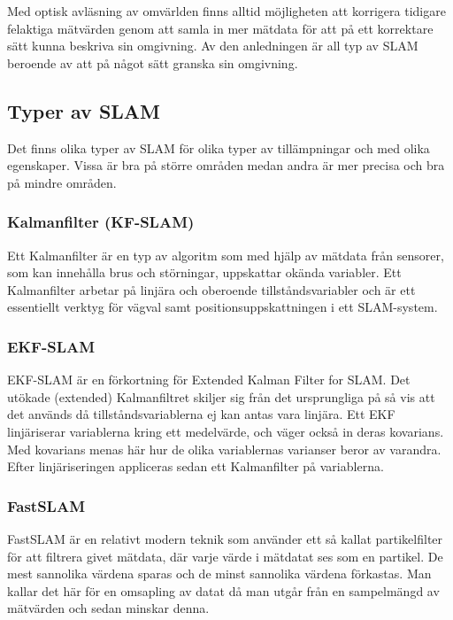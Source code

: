 \documentclass[a4paper,12pt,fleqn]{article}
\begin{document}
Med optisk avläsning av omvärlden finns alltid möjligheten att korrigera tidigare felaktiga mätvärden genom att samla in mer mätdata för att på ett korrektare sätt kunna beskriva sin omgivning. Av den anledningen är all typ av SLAM beroende av att på något sätt granska sin omgivning. 

\newpage


\subsection{Typer av SLAM}
Det finns olika typer av SLAM för olika typer av tillämpningar och med olika egenskaper. Vissa är bra på större områden medan andra är mer precisa och bra på mindre områden. 

\subsubsection{Kalmanfilter (KF-SLAM)}
Ett Kalmanfilter är en typ av algoritm som med hjälp av mätdata från sensorer, som kan innehålla brus och störningar, uppskattar okända variabler. Ett Kalmanfilter arbetar på linjära och oberoende tillståndsvariabler och är ett essentiellt verktyg för vägval samt positionsuppskattningen i ett SLAM-system. 

\subsubsection{EKF-SLAM} 
EKF-SLAM är en förkortning för Extended Kalman Filter for SLAM. Det utökade (extended) Kalmanfiltret skiljer sig från det ursprungliga på så vis att det används då tillståndsvariablerna ej kan antas vara linjära. Ett EKF linjäriserar variablerna kring ett medelvärde, och väger också in deras kovarians. Med kovarians menas här hur de olika variablernas varianser beror av varandra. Efter linjäriseringen appliceras sedan ett Kalmanfilter på variablerna.

\subsubsection{FastSLAM}
FastSLAM är en relativt modern teknik som använder ett så kallat partikelfilter för att filtrera givet mätdata, där varje värde i mätdatat ses som en partikel. De mest sannolika värdena sparas och de minst sannolika värdena förkastas. Man kallar det här för en omsapling av datat då man utgår från en sampelmängd av mätvärden och sedan minskar denna. 
\end{document}
